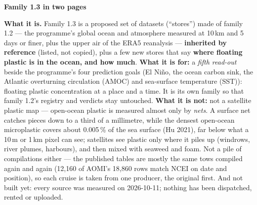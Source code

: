 \documentclass[10pt]{article}
\begin{document}
{\LARGE\bfseries Family 1.3 in two pages\par}
\vspace{2pt}{\large where floating plastic is, and how much --- the nets first, the satellites tested against them\par}
\vspace{2pt}{\small blauewelt/earth --- two-page summary of the design note, 11 October 2026. A glossary of every term follows the two pages.\par}
\vspace{4pt}

\textbf{What it is.} Family 1.3 is a proposed set of datasets (``stores'') made of family 1.2 --- the programme's
global ocean and atmosphere measured at 10\,km and 5 days or finer, plus the upper air of the ERA5 reanalysis ---
\textbf{inherited by reference} (listed, not copied), plus a few new stores that say \textbf{where floating plastic
is in the ocean, and how much}. \textbf{What it is for:} a \emph{fifth read-out} beside the programme's four
prediction goals (El Ni\~no, the ocean carbon sink, the Atlantic overturning circulation (AMOC) and sea-surface
temperature (SST)): floating plastic concentration at a place and a time. It is its own family so that family 1.2's
registry and verdicts stay untouched. \textbf{What it is not:} not a satellite plastic map --- open-ocean plastic is
measured almost only by \emph{nets}. A surface net catches pieces down to a third of a millimetre, while the densest
open-ocean microplastic covers about 0.005\,\% of the sea surface (Hu 2021), far below what a 10\,m or 1\,km pixel
can see; satellites see plastic only where it piles up (windrows, river plumes, harbours), and then mixed with
seaweed and foam. Not a pile of compilations either --- the published tables are mostly the same tows compiled
again and again (12,160 of AOMI's 18,860 rows match NCEI on date and position), so each cruise is taken from one
producer, the original first. And not built yet: every source was measured on 2026-10-11; nothing has been
dispatched, rented or uploaded.
\end{document}
